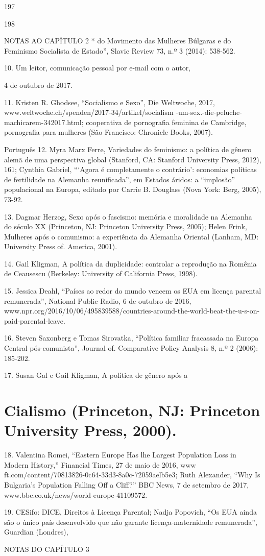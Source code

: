 197
 \par 
198
 \par 
NOTAS AO CAPÍTULO {\color{blue}2} * do Movimento das Mulheres Búlgaras e do Feminismo Socialista de Estado”, Slavic Review 73, n.º {\color{blue}3} (2014): 538-562.
 \par 
10. Um leitor, comunicação pessoal por e-mail com o autor,
 \par 
4 de outubro de 2017.
 \par 
11. Kristen R. Ghodsee, “Socialismo e Sexo”, Die Weltwoche, 2017, www.weltwoche.ch/spenden/2017-34/artikel/socialism -um-sex.-die-peluche-machicarem-342017.html; cooperativa de pornografia feminina de Cambridge, pornografia para mulheres (São Francisco: Chronicle Books, 2007).
 \par 
Português {\color{blue}12}. Myra Marx Ferre, Variedades do feminismo: a política de gênero alemã de uma perspectiva global (Stanford, CA: Stanford University Press, 2012), 161; Cynthia Gabriel, “‘Agora é completamente o contrário’: economias políticas de fertilidade na Alemanha reunificada”, em Estados áridos: a “implosão” populacional na Europa, editado por Carrie B. Douglass (Nova York: Berg, 2005), 73-92.
 \par 
13. Dagmar Herzog, Sexo após o fascismo: memória e moralidade na Alemanha do século XX (Princeton, NJ: Princeton University Press, 2005); Helen Frink, Mulheres após o comunismo: a experiência da Alemanha Oriental (Lanham, MD: University Press of. America, 2001).
 \par 
14. Gail Kligman, A política da duplicidade: controlar a reprodução na Romênia de Ceausescu (Berkeley: University of California Press, 1998).
 \par 
15. Jessica Deahl, “Países ao redor do mundo vencem os EUA em licença parental remunerada”, National Public Radio, {\color{blue}6} de outubro de 2016, www.npr.org/2016/10/06/495839588/countries-around-the-world-beat-the-u-s-on-paid-parental-leave.
 \par 
16. Steven Saxonberg e Tomas Sirovatka, “Política familiar fracassada na Europa Central pós-comunista”, Journal of. Comparative Policy Analysis 8, n.º {\color{blue}2} (2006): 185-202.
 \par 
17. Susan Gal e Gail Kligman, A política de gênero após a
 \par 
\section{Cialismo (Princeton, NJ: Princeton University Press, 2000).}
 \par 
18. Valentina Romei, “Eastern Europe Has lhe Largest Population Loss in Modern History,” Financial Times, {\color{blue}27} de maio de 2016, www ft.com/content/70813826-0c64-33d3-8a0c-72059aelb5e3; Ruth Alexander, “Why Is Bulgaria’s Population Falling Off a Cliff?” BBC News, {\color{blue}7} de setembro de 2017, www.bbc.co.uk/news/world-europe-41109572.
 \par 
19. CESifo: DICE, Direitos à Licença Parental; Nadja Popovich, “Os EUA ainda são o único país desenvolvido que não garante licença-maternidade remunerada”, Guardian (Londres),
 \par 
NOTAS DO CAPÍTULO {\color{blue}3}
 \par 
